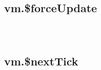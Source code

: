 \begin{lstlisting}[language=JavaScript]

\end{lstlisting}




\begin{lstlisting}[language=JavaScript]

\end{lstlisting}




\begin{lstlisting}[language=JavaScript]

\end{lstlisting}



\subsection{vm.\$forceUpdate}








\begin{lstlisting}[language=JavaScript]

\end{lstlisting}




\begin{lstlisting}[language=JavaScript]

\end{lstlisting}




\begin{lstlisting}[language=JavaScript]

\end{lstlisting}




\subsection{vm.\$nextTick}








\begin{lstlisting}[language=JavaScript]

\end{lstlisting}




\begin{lstlisting}[language=JavaScript]

\end{lstlisting}




